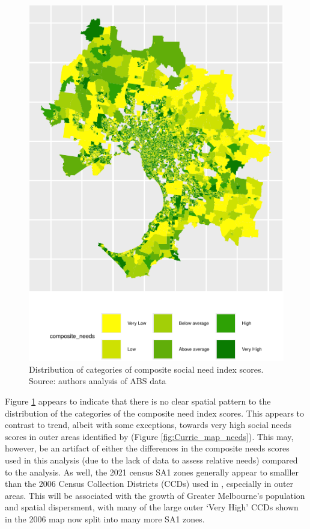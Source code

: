 \documentclass[preprint, 3p,
authoryear]{elsarticle} %
\begin{document}
\begin{figure}
\includegraphics[width=0.9\linewidth]{Leveraging_GTFS_to_assess_transit_supply_Transport_Geography_files/figure-latex/Greater_Melbourne_2021_social_needs-1} \caption{Distribution of categories of composite social need index scores. Source: authors analysis of ABS data}\label{fig:Greater_Melbourne_2021_social_needs}
\end{figure}

Figure \ref{fig:Greater_Melbourne_2021_social_needs} appears to indicate
that there is no clear spatial pattern to the distribution of the
categories of the composite need index scores. This appears to contrast
to trend, albeit with some exceptions, towards very high social needs
scores in outer areas identified by \citet{currie2010identifying}
(Figure \ref{fig:Currie_map_needs}). This may, however, be an artifact
of either the differences in the composite needs scores used in this
analysis (due to the lack of data to assess relative needs) compared to
the \citet{currie2010identifying} analysis. As well, the 2021 census SA1
zones generally appear to smalller than the 2006 Census Collection
Districts (CCDs) used in \citet{currie2010identifying}, especially in
outer areas. This will be associated with the growth of Greater
Melbourne's population and spatial dispersment, with many of the large
outer `Very High' CCDs shown in the 2006 map now split into many more
SA1 zones.
\end{document}
